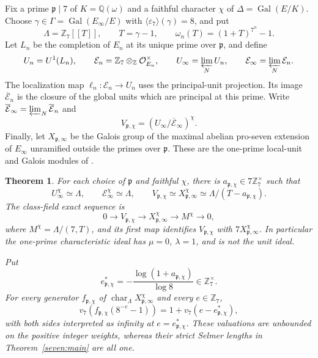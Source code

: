 \documentclass[11pt]{article}
\newtheorem{theorem}{Theorem}
\begin{document}
Fix a prime $\mathfrak p\mid7$ of $K=\mathbb Q(\omega)$ and a faithful
character $\chi$ of $\Delta=\operatorname{Gal}(E/K)$. Choose
$\gamma\in\Gamma=\operatorname{Gal}(E_\infty/E)$ with
$\langle\varepsilon_7\rangle(\gamma)=8$, and put
\[
 \Lambda=\mathbb Z_7[[T]],\qquad T=\gamma-1,\qquad
 \omega_n(T)=(1+T)^{7^n}-1.
\]
Let $L_n$ be the completion of $E_n$ at its unique prime over
$\mathfrak p$, and define
\[
 U_n=U^1(L_n),\qquad
 \mathcal E_n=\mathbb Z_7\otimes_{\mathbb Z}\mathcal O_{E_n}^{\times},
 \qquad
 U_\infty=\varprojlim_N U_n,\qquad
 \mathcal E_\infty=\varprojlim_N\mathcal E_n.
\]
The localization map $\ell_n:\mathcal E_n\to U_n$ uses the principal-unit
projection. Its image $\overline{\mathcal E}_n$ is the closure of the
global units which are principal at this prime. Write
$\overline{\mathcal E}_\infty=\varprojlim_N\overline{\mathcal E}_n$ and
\[
 V_{\mathfrak p,\chi}
   =(U_\infty/\overline{\mathcal E}_\infty)^\chi.
\]
Finally, let $X_{\mathfrak p,\infty}$ be the Galois group of the maximal
abelian pro-seven extension of $E_\infty$ unramified outside the primes
over $\mathfrak p$. These are the one-prime local-unit and Galois modules
of \cite[printed p.~36]{Rubin}.

\begin{theorem}\label{seven:one-prime-linear}
For each choice of $\mathfrak p$ and faithful $\chi$, there is
$a_{\mathfrak p,\chi}\in7\mathbb Z_7^\times$ such that
\[
 U_\infty^\chi\simeq\Lambda,\qquad
 \mathcal E_\infty^\chi\simeq\Lambda,\qquad
 V_{\mathfrak p,\chi}\simeq
 X_{\mathfrak p,\infty}^\chi
 \simeq\Lambda/(T-a_{\mathfrak p,\chi}).
\]
The class-field exact sequence is
\begin{equation*}\tag{U1}\label{seven:one-prime-exact}
 0\longrightarrow V_{\mathfrak p,\chi}
 \longrightarrow X_{\mathfrak p,\infty}^\chi
 \longrightarrow M^\chi
 \longrightarrow0,
\end{equation*}
where $M^\chi=\Lambda/(7,T)$, and its first map identifies
$V_{\mathfrak p,\chi}$ with $7X_{\mathfrak p,\infty}^\chi$.
In particular the one-prime characteristic ideal has
$\mu=0$, $\lambda=1$, and is not the unit ideal.

Put
\[
 e_{\mathfrak p,\chi}^{*}
 =-\frac{\log(1+a_{\mathfrak p,\chi})}{\log8}
 \in\mathbb Z_7^\times.
\]
For every generator $f_{\mathfrak p,\chi}$ of
$\operatorname{char}_{\Lambda}X_{\mathfrak p,\infty}^\chi$ and every
$e\in\mathbb Z_7$,
\begin{equation*}\tag{U2}\label{seven:one-prime-weight-valuation}
 v_7\!\left(f_{\mathfrak p,\chi}(8^{-e}-1)\right)
 =1+v_7(e-e_{\mathfrak p,\chi}^{*}),
\end{equation*}
with both sides interpreted as infinity at
$e=e_{\mathfrak p,\chi}^{*}$. These valuations are unbounded on the
positive integer weights, whereas their strict Selmer lengths in
Theorem~\ref{seven:main} are all one.
\end{theorem}
\end{document}
